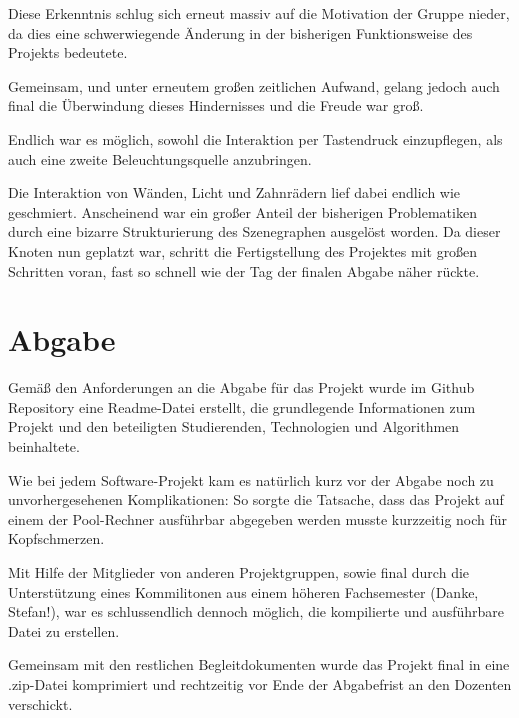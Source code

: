 \documentclass{article}
\begin{document}
Diese Erkenntnis schlug sich erneut massiv auf die Motivation der Gruppe nieder, da dies eine schwerwiegende Änderung in der bisherigen Funktionsweise des Projekts bedeutete. 

Gemeinsam, und unter erneutem großen zeitlichen Aufwand, gelang jedoch auch final die Überwindung dieses Hindernisses und die Freude war groß. 

Endlich war es möglich, sowohl die Interaktion per Tastendruck einzupflegen, als auch eine zweite Beleuchtungsquelle anzubringen. 

Die Interaktion von Wänden, Licht und Zahnrädern lief dabei endlich wie geschmiert. 
Anscheinend war ein großer Anteil der bisherigen Problematiken durch eine bizarre Strukturierung des Szenegraphen ausgelöst worden. 
Da dieser Knoten nun geplatzt war, schritt die Fertigstellung des Projektes mit großen Schritten voran, fast so schnell wie der Tag der finalen Abgabe näher rückte. 

\section{Abgabe}
Gemäß den Anforderungen an die Abgabe für das Projekt wurde im Github Repository eine Readme-Datei erstellt, die grundlegende Informationen zum Projekt und den beteiligten Studierenden, Technologien und Algorithmen beinhaltete. 

Wie bei jedem Software-Projekt kam es natürlich kurz vor der Abgabe noch zu unvorhergesehenen Komplikationen: 
So sorgte die Tatsache, dass das Projekt auf einem der Pool-Rechner ausführbar abgegeben werden musste kurzzeitig noch für Kopfschmerzen. 

Mit Hilfe der Mitglieder von anderen Projektgruppen, sowie final durch die Unterstützung eines Kommilitonen aus einem höheren Fachsemester (Danke, Stefan!), war es schlussendlich dennoch möglich, die kompilierte und ausführbare Datei zu erstellen. 

Gemeinsam mit den restlichen Begleitdokumenten wurde das Projekt final in eine .zip-Datei komprimiert und rechtzeitig vor Ende der Abgabefrist an den Dozenten verschickt. 
\end{document}
